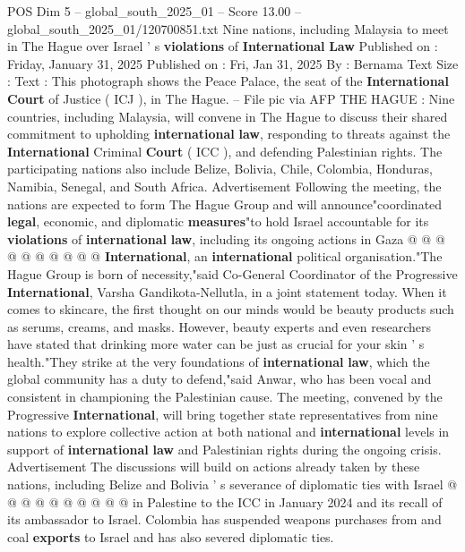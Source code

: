 \begin{textsample}{POS Dim 5 – global\_south\_2025\_01 – Score 13.00 – global\_south\_2025\_01/120700851.txt}  \label{ex:f5_pos_358}
Nine nations, including Malaysia to meet in The Hague over Israel ' s \textbf{violations} of \textbf{International} \textbf{Law} Published on : Friday, January 31, 2025 Published on : Fri, Jan 31, 2025 By : Bernama Text Size : Text : This photograph shows the Peace Palace, the seat of the \textbf{International} \textbf{Court} of Justice ( ICJ ), in The Hague. -- File pic via AFP THE HAGUE : Nine countries, including Malaysia, will convene in The Hague to discuss their shared commitment to upholding \textbf{international} \textbf{law}, responding to threats against the \textbf{International} Criminal \textbf{Court} ( ICC ), and defending Palestinian rights.
The participating nations also include Belize, Bolivia, Chile, Colombia, Honduras, Namibia, Senegal, and South Africa.
Advertisement Following the meeting, the nations are expected to form The Hague Group and will announce"coordinated \textbf{legal}, economic, and diplomatic \textbf{measures}"to hold Israel accountable for its \textbf{violations} of \textbf{international} \textbf{law}, including its ongoing actions in Gaza @ @ @ @ @ @ @ @ @ @ \textbf{International}, an \textbf{international} political organisation."The Hague Group is born of necessity,"said Co-General Coordinator of the Progressive \textbf{International}, Varsha Gandikota-Nellutla, in a joint statement today.
When it comes to skincare, the first thought on our minds would be beauty products such as serums, creams, and masks.
However, beauty experts and even researchers have stated that drinking more water can be just as crucial for your skin ' s health."They strike at the very foundations of \textbf{international} \textbf{law}, which the global community has a duty to defend,"said Anwar, who has been vocal and consistent in championing the Palestinian cause.
The meeting, convened by the Progressive \textbf{International}, will bring together state representatives from nine nations to explore collective action at both national and \textbf{international} levels in support of \textbf{international} \textbf{law} and Palestinian rights during the ongoing crisis.
Advertisement The discussions will build on actions already taken by these nations, including Belize and Bolivia ' s severance of diplomatic ties with Israel @ @ @ @ @ @ @ @ @ @ in Palestine to the ICC in January 2024 and its recall of its ambassador to Israel.
Colombia has suspended weapons purchases from and coal \textbf{exports} to Israel and has also severed diplomatic ties.

\end{textsample}
